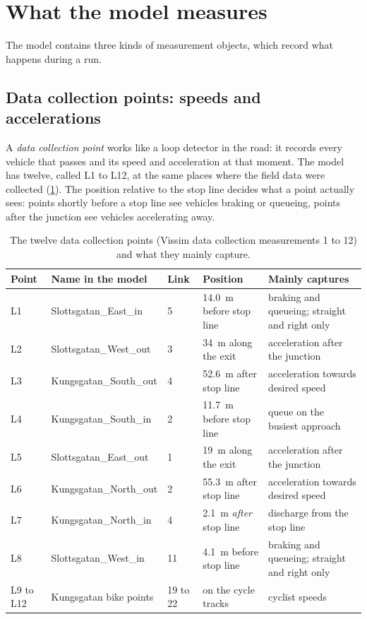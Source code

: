 \documentclass[11pt,a4paper]{article}
\begin{document}
\section{What the model measures}
\label{sec:measure}

The model contains three kinds of measurement objects, which record what happens during a run.

\subsection{Data collection points: speeds and accelerations}

A \emph{data collection point} works like a loop detector in the road: it records every vehicle
that passes and its speed and acceleration at that moment. The model has twelve, called L1 to L12,
at the same places where the field data were collected (\cref{tab:dc}). The position relative to
the stop line decides what a point actually sees: points shortly before a stop line see vehicles
braking or queueing, points after the junction see vehicles accelerating away.

\begin{table}[!htb]
\centering
\caption[Data collection points]{The twelve data collection points (Vissim data collection
measurements 1 to 12) and what they mainly capture.}
\label{tab:dc}
\small
\begin{tabularx}{\textwidth}{llllX}
\toprule
\textbf{Point} & \textbf{Name in the model} & \textbf{Link} & \textbf{Position} & \textbf{Mainly captures}\\
\midrule
L1  & Slottsgatan\_East\_in   & 5  & 14.0~m before stop line & braking and queueing; straight and right only\\
L2  & Slottsgatan\_West\_out  & 3  & 34~m along the exit     & acceleration after the junction\\
L3  & Kungsgatan\_South\_out  & 4  & 52.6~m after stop line  & acceleration towards desired speed\\
L4  & Kungsgatan\_South\_in   & 2  & 11.7~m before stop line & queue on the busiest approach\\
L5  & Slottsgatan\_East\_out  & 1  & 19~m along the exit     & acceleration after the junction\\
L6  & Kungsgatan\_North\_out  & 2  & 55.3~m after stop line  & acceleration towards desired speed\\
L7  & Kungsgatan\_North\_in   & 4  & 2.1~m \emph{after} stop line & discharge from the stop line\\
L8  & Slottsgatan\_West\_in   & 11 & 4.1~m before stop line  & braking and queueing; straight and right only\\
L9 to L12 & Kungsgatan bike points & 19 to 22 & on the cycle tracks & cyclist speeds\\
\bottomrule
\end{tabularx}
\end{table}
\end{document}
